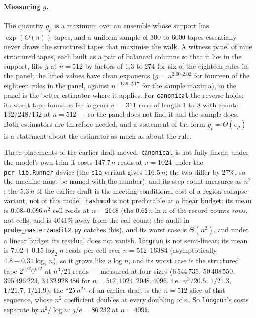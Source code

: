 \documentclass[11pt]{article}
\theoremstyle{remark}
\begin{document}
\paragraph{Measuring $g$.} The quantity $g_{\rho}$ is a maximum over an ensemble whose support has
$\exp(\Theta(n))$ tapes, and a uniform sample of 300 to 6000 tapes essentially never draws the
structured tapes that maximise the walk. A witness panel of nine structured tapes, each built as a
pair of balanced columns so that it lies in the support, lifts $g$ at $n=512$ by factors of $1.3$ to
$274$ for six of the eighteen rules in the panel; the lifted values have clean exponents ($g=n^{2.00\text{--}2.02}$
for fourteen of the eighteen rules in the panel, against $n^{-0.36\text{--}2.17}$ for the sample maxima), so the panel is
the better estimator where it applies. For \texttt{canonical} the reverse holds: its worst tape found
so far is generic --- $311$ runs of length $1$ to $8$ with counts $132/248/132$ at $n=512$ --- so the
panel does not find it and the sample does. Both estimators are therefore needed, and a statement of
the form $g_{\rho}=\Theta(e_{\rho})$ is a statement about the estimator as much as about the rule.

Three placements of the earlier draft moved. \texttt{canonical} is not fully linear: under the model's
own trim it costs $147.7\,n$ reads at $n=1024$ under the \texttt{pcr\_lib.Runner} device (the
\texttt{c1a} variant gives $116.5\,n$; the two differ by $27\%$, so the machine must be named with
the number), and its step count measures as $n^{2}$; the $5.3\,n$ of
the earlier draft is the meeting-conditional cost of a region-collapse variant, not of this model.
\texttt{hashmod} is not predictable at a linear budget: its mean is $0.08$--$0.096\,n^{2}$ cell reads at $n=2048$ (the
$0.62\,n\ln n$ of the record counts \emph{rows}, not cells, and is $4041\%$ away from the cell
count; the audit in \texttt{probe\_master/audit2.py} catches this), and its worst case is
$\Theta(n^{2})$, and under a linear budget its residual does not vanish. \texttt{longrun} is not
semi-linear: its mean is $7.02+0.15\log_2 n$ reads per cell over $n=512$--$16384$ (asymptotically
$4.8+0.31\log_2 n$), so it grows like $n\log n$, and its worst
case is the structured tape $2^{n/2}0^{n/2}$ at $n^{3}/21$ reads --- measured at four sizes
($6\,544\,735$, $50\,408\,550$, $395\,496\,223$, $3\,132\,928\,486$ for $n=512,1024,2048,4096$,
i.e.\ $n^{3}/20.5$, $1/21.3$, $1/21.7$, $1/21.9$); the ``$25\,n^{2}$'' of an earlier draft is the
$n=512$ slice of that sequence, whose $n^{2}$ coefficient doubles at every doubling of $n$. So
\texttt{longrun}'s costs separate by $n^{2}/\log n$: $g/e=86\,232$ at $n=4096$.
\end{document}
